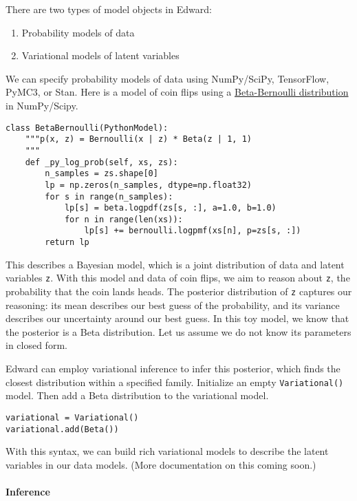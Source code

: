There are two types of model objects in Edward:

\begin{enumerate}
\def\labelenumi{\arabic{enumi}.}
\tightlist
\item
  Probability models of data
\item
  Variational models of latent variables
\end{enumerate}

We can specify probability models of data using NumPy/SciPy, TensorFlow,
PyMC3, or Stan. Here is a model of coin flips using a
\href{https://en.wikipedia.org/wiki/Beta-binomial_distribution}{Beta-Bernoulli
distribution} in NumPy/Scipy.

\begin{verbatim}
class BetaBernoulli(PythonModel):
    """p(x, z) = Bernoulli(x | z) * Beta(z | 1, 1)
    """
    def _py_log_prob(self, xs, zs):
        n_samples = zs.shape[0]
        lp = np.zeros(n_samples, dtype=np.float32)
        for s in range(n_samples):
            lp[s] = beta.logpdf(zs[s, :], a=1.0, b=1.0)
            for n in range(len(xs)):
                lp[s] += bernoulli.logpmf(xs[n], p=zs[s, :])
        return lp
\end{verbatim}

This describes a Bayesian model, which is a joint distribution of data
and latent variables \texttt{z}. With this model and data of coin flips,
we aim to reason about \texttt{z}, the probability that the coin lands
heads. The posterior distribution of \texttt{z} captures our reasoning:
its mean describes our best guess of the probability, and its variance
describes our uncertainty around our best guess. In this toy model, we
know that the posterior is a Beta distribution. Let us assume we do not
know its parameters in closed form.

Edward can employ variational inference to infer this posterior, which
finds the closest distribution within a specified family. Initialize an
empty \texttt{Variational()} model. Then add a Beta distribution to the
variational model.

\begin{verbatim}
variational = Variational()
variational.add(Beta())
\end{verbatim}

With this syntax, we can build rich variational models to describe the
latent variables in our data models. (More documentation on this coming
soon.)

\paragraph{Inference}\label{inference}

